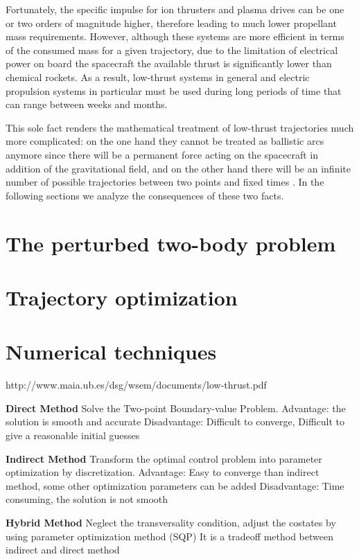 Fortunately, the specific impulse for ion thrusters and plasma drives can be one or two orders of magnitude higher, therefore leading to much lower propellant mass requirements. However, although these systems are more efficient in terms of the consumed mass for a given trajectory, due to the limitation of electrical power on board the spacecraft the available thrust is significantly lower than chemical rockets. As a result, low-thrust systems in general and electric propulsion systems in particular must be used during long periods of time that can range between weeks and months.

This sole fact renders the mathematical treatment of low-thrust trajectories much more complicated: on the one hand they cannot be treated as ballistic arcs anymore since there will be a permanent force acting on the spacecraft in addition of the gravitational field, and on the other hand there will be an infinite number of possible trajectories between two points and fixed times \cite{woodcock2002benefits}. In the following sections we analyze the consequences of these two facts.

\section{The perturbed two-body problem}

\section{Trajectory optimization}

\section{Numerical techniques}


http://www.maia.ub.es/dsg/wsem/documents/low-thrust.pdf

\textbf{Direct Method}
Solve the Two-point Boundary-value Problem.
Advantage: the solution is smooth and accurate
Disadvantage: Difficult to converge, Difficult to give a reasonable initial guesses 

\textbf{Indirect Method}
Transform the optimal control problem into parameter 
optimization by discretization.
Advantage: Easy to converge than indirect method, some other optimization parameters can be added
Disadvantage: Time consuming, the solution is not smooth 

\textbf{Hybrid Method}
Neglect the transversality condition, adjust the costates by using parameter optimization method (SQP)
It is a tradeoff method between indirect and direct method

